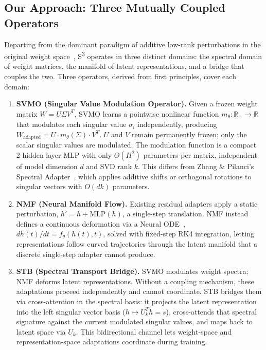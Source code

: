 \documentclass{scpe}
\newcommand{\svmo}{\textsc{SVMO}}
\newcommand{\nmf}{\textsc{NMF}}
\newcommand{\stb}{\textsc{STB}}
\newcommand{\sthree}{S\textsuperscript{3}}
\begin{document}
\subsection{Our Approach: Three Mutually Coupled Operators}

Departing from the dominant paradigm of additive low-rank perturbations in the original weight space~\cite{hu2021lora}, \sthree{} operates in three distinct domains: the spectral domain of weight matrices, the manifold of latent representations, and a bridge that couples the two. Three operators, derived from first principles, cover each domain:

\begin{enumerate}[leftmargin=*]
    \item \textbf{\svmo{} (Singular Value Modulation Operator).} Given a frozen weight matrix $W = U\Sigma V^T$, \svmo{} learns a pointwise nonlinear function $m_\theta: \mathbb{R}_+ \to \mathbb{R}$ that modulates each singular value $\sigma_i$ independently, producing $W_{\text{adapted}} = U \cdot m_\theta(\Sigma) \cdot V^T$. $U$ and $V$ remain permanently frozen; only the scalar singular values are modulated. The modulation function is a compact 2-hidden-layer MLP with only $O(H^2)$ parameters per matrix, independent of model dimension $d$ and SVD rank $k$. This differs from Zhang \& Pilanci's Spectral Adapter~\cite{zhang2024spectral}, which applies additive shifts or orthogonal rotations to singular vectors with $O(dk)$ parameters.

    \item \textbf{\nmf{} (Neural Manifold Flow).} Existing residual adapters apply a static perturbation, $h' = h + \text{MLP}(h)$, a single-step translation. \nmf{} instead defines a continuous deformation via a Neural ODE~\cite{chen2018neuralode}, $dh(t)/dt = f_\theta(h(t), t)$, solved with fixed-step RK4 integration, letting representations follow curved trajectories through the latent manifold that a discrete single-step adapter cannot produce.

    \item \textbf{\stb{} (Spectral Transport Bridge).} \svmo{} modulates weight spectra; \nmf{} deforms latent representations. Without a coupling mechanism, these adaptations proceed independently and cannot coordinate. \stb{} bridges them via cross-attention in the spectral basis: it projects the latent representation into the left singular vector basis ($h \mapsto U_k^T h = s$), cross-attends that spectral signature against the current modulated singular values, and maps back to latent space via $U_k$. This bidirectional channel lets weight-space and representation-space adaptations coordinate during training.
\end{enumerate}
\end{document}
